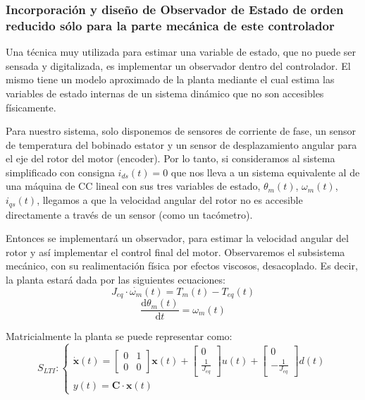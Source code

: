 \documentclass[10pt]{article}
\begin{document}
\subsubsection{Incorporación y diseño de Observador de Estado de orden reducido sólo para la parte mecánica de este controlador}

Una técnica muy utilizada para estimar una variable de estado, que no puede ser sensada y digitalizada, es implementar un observador dentro del controlador. El mismo tiene un modelo aproximado de la planta mediante el cual estima las variables de estado internas de un sistema dinámico que no son accesibles físicamente.
\par
Para nuestro sistema, solo disponemos de sensores de corriente de fase, un sensor de temperatura del bobinado estator y un sensor de desplazamiento angular para el eje del rotor del motor (encoder).
Por lo tanto, si consideramos al sistema simplificado con consigna $i_{ds}(t) = 0$ que nos lleva a un sistema equivalente al de una máquina de CC lineal con sus tres variables de estado, $\theta_m(t)$, $\omega_m(t)$, $i_{qs}(t)$, llegamos a que la velocidad angular del rotor no es accesible directamente a través de un sensor (como un tacómetro).
\par
Entonces se implementará un observador, para estimar la velocidad angular del rotor y así implementar el control final del motor.
Observaremos el subsistema mecánico, con su realimentación física por efectos viscosos, desacoplado.
Es decir, la planta estará dada por las siguientes ecuaciones:
\begin{equation}
	J_{eq}\cdot \dot{\omega_m}(t) = T_m(t) − T_{eq}(t)
\end{equation}
\begin{equation}
	\frac{\mathrm{d} \theta_m(t)}{\mathrm{d} t}=\omega_m(t)
\end{equation}

Matricialmente la planta se puede representar como:
\begin{equation}
	S_{LTI}:
	\begin{cases}
		\dot{\textbf{x}}(t) = 
		\begin{bmatrix}
		0 & 1 \\ 
		0 & 0
		\end{bmatrix} \textbf{x}(t) + 
		\begin{bmatrix}
			0  \\ 
			\frac{1}{J_{eq}} 
		\end{bmatrix}
		u(t) + 
		\begin{bmatrix}
			0  \\ 
			-\frac{1}{J_{eq}} 
		\end{bmatrix}
		d(t)
		\\
		y(t)= \textbf{C}\cdot \textbf{x}(t)
	\end{cases}
\end{equation}
\end{document}
